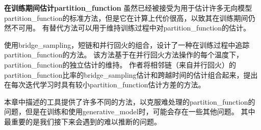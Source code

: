 \textbf{在训练期间估计\gls{partition_function}}
虽然已经被接受为用于估计许多无向模型\gls{partition_function}的标准方法，但是它在计算上代价很高，以致其在训练期间仍然不可用。
有替代方法可以用于维持训练过程中对\gls{partition_function}的估计。


使用\gls{bridge_sampling}，短链和并行回火的组合，\cite{Desjardins+al-NIPS2011}设计了一种在训练过程中追踪\gls{partition_function}的方法。
该方法基于在并行回火方法操作的每个温度下，\gls{partition_function}的独立估计的维持。
作者将相邻链（来自并行回火）的\gls{partition_function}比率的\gls{bridge_sampling}估计和跨越时间的估计组合起来，提出在每次迭代学习时具有较小\gls{partition_function}估计方差的方法。


本章中描述的工具提供了许多不同的方法，以克服难处理的\gls{partition_function}的问题，但是在训练和使用\gls{generative_model}时，可能会存在一些其他问题。
其中最重要的是我们接下来会遇到的难以推断的问题。

